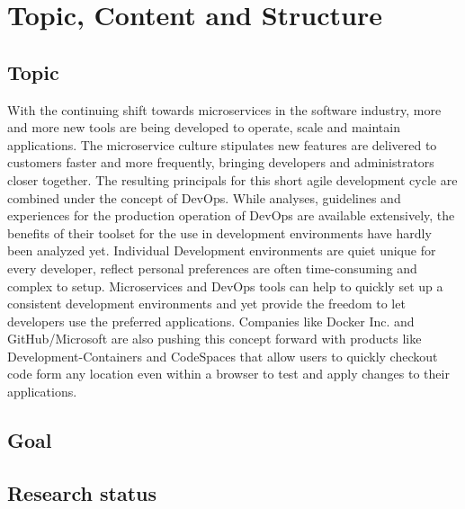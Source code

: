 \documentclass[12pt, a4paper]{article}
\begin{document}


\tableofcontents
\newpage
{}
\setcounter{lastroman}{\value{page}}

\pagestyle{plain}

\section{Topic, Content and Structure}
\subsection{Topic}
With the continuing shift towards microservices in the software industry, more and more new tools are being developed to operate, scale and maintain applications. The microservice culture stipulates new features are delivered to customers faster and more frequently, bringing developers and administrators closer together. The resulting principals for this short agile development cycle are combined under the concept of DevOps. While analyses, guidelines and experiences for the production operation of DevOps are available extensively, the benefits of their toolset for the use in development environments have hardly been analyzed yet.\newline
Individual Development environments are quiet unique for every developer, reflect personal preferences are often time-consuming and complex to setup. Microservices and DevOps tools can help to quickly set up a consistent development environments and yet provide the freedom to let developers use the preferred applications. Companies like Docker Inc. and GitHub/Microsoft are also pushing this concept forward with products like Development-Containers and CodeSpaces that allow users to quickly checkout code form any location even within a browser to test and apply changes to their applications.
\subsection{Goal}
\subsection{Research status}
\end{document}
